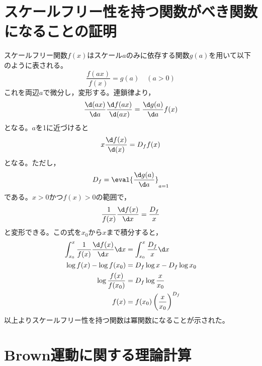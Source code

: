 \documentclass[autodetect-engine,dvi=dvipdfmx,a4paper,ja=standard,oneside,openany,11pt,draft]{bxjsbook}
\begin{document}
\appendix
\chapter{スケールフリー性を持つ関数がべき関数になることの証明}
\label{sec:scale_free}
スケールフリー関数$f(x)$はスケール$a$のみに依存する関数$g(a)$を用いて以下のように表される。
\begin{equation}
  \frac{f(ax)}{f(x)}=g(a) \quad (a>0)
\end{equation}
これを両辺$a$で微分し，変形する。連鎖律より，
\begin{equation}
  \frac{\d (ax)}{\d a}\frac{\d f(ax)}{\d (ax)}          =\frac{\d g(a)}{\d a}f(x)
\end{equation}
となる。$a$を1に近づけると
\begin{equation}
  x\frac{\d f(x)}{\d (x)}                 =D_f f(x)
\end{equation}
となる。ただし，
\begin{equation}
  D_f=\eval{\frac{\d g(a)}{\d a}}_{a=1}
\end{equation}
である。$x>0$かつ$f(x)>0$の範囲で，
\begin{equation}
  \frac{1}{f(x)}\frac{\d f(x)}{\d x}                    =\frac{D_f}{x}
\end{equation}
と変形できる。この式を$x_0$から$x$まで積分すると，
\begin{equation}
  \begin{split}
    \int_{x_0}^{x} \frac{1}{f(x)}\frac{\d f(x)}{\d x}\d x & =\int_{x_0}^{x} \frac{D_f}{x}\d x       \\
    \log f(x)-\log f(x_0)                                 & =D_f\log x-D_f\log x_0                  \\
    \log \frac{f(x)}{f(x_0)}                              & =D_f\log \frac{x}{x_0}                  \\
    f(x)                                                  & =f(x_0)\left(\frac{x}{x_0}\right)^{D_f}
  \end{split}
\end{equation}
以上よりスケールフリー性を持つ関数は冪関数になることが示された。
\chapter{Brown運動に関する理論計算}
\end{document}

